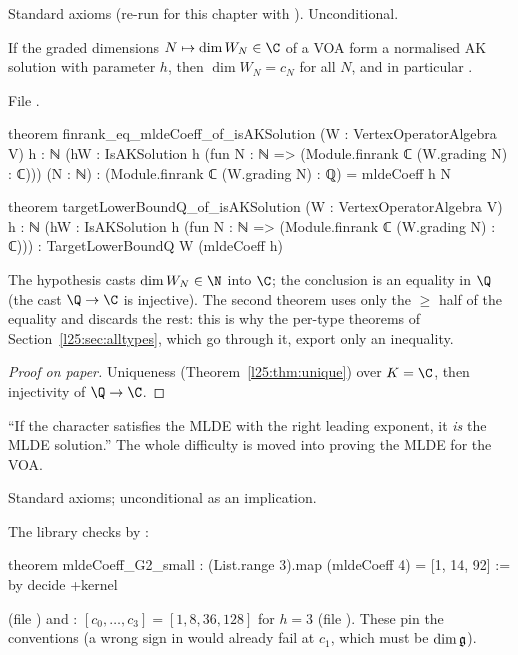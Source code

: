 \begin{status}
Standard axioms (re-run for this chapter with ). Unconditional.
\end{status}

\begin{theorem}\label{l25:thm:fromAK}
If the graded dimensions $N\mapsto\dim W_N\in\C$ of a VOA form a normalised AK solution with parameter $h$, then
$\dim W_N=c_N$ for all $N$, and in particular .
\end{theorem}
\noindent File .
\begin{leancode}
theorem finrank_eq_mldeCoeff_of_isAKSolution (W : VertexOperatorAlgebra V) {h : ℕ}
    (hW : IsAKSolution h (fun N : ℕ => (Module.finrank ℂ (W.grading N) : ℂ))) (N : ℕ) :
    (Module.finrank ℂ (W.grading N) : ℚ) = mldeCoeff h N

theorem targetLowerBoundQ_of_isAKSolution (W : VertexOperatorAlgebra V) {h : ℕ}
    (hW : IsAKSolution h (fun N : ℕ => (Module.finrank ℂ (W.grading N) : ℂ))) :
    TargetLowerBoundQ W (mldeCoeff h)
\end{leancode}
\begin{dictionary}
The hypothesis casts $\dim W_N\in\N$ into $\C$; the conclusion is an equality in $\Q$ (the cast $\Q\to\C$ is
injective). The second theorem uses only the $\ge$ half of the equality and discards the rest: this is why the
per-type theorems of Section~\ref{l25:sec:alltypes}, which go through it, export only an inequality.
\end{dictionary}
\begin{proof}[Proof on paper]
Uniqueness (Theorem~\ref{l25:thm:unique}) over $K=\C$, then injectivity of $\Q\to\C$.
\end{proof}
\begin{physics}
``If the character satisfies the MLDE with the right leading exponent, it \emph{is} the MLDE solution.'' The
whole difficulty is moved into proving the MLDE for the VOA.
\end{physics}
\begin{status}
Standard axioms; unconditional as an implication.
\end{status}

\begin{example}\label{l25:ex:small}
The library checks by :
\begin{leancode}
theorem mldeCoeff_G2_small : (List.range 3).map (mldeCoeff 4) = [1, 14, 92] := by decide +kernel
\end{leancode}
\noindent (file ) and
: $[c_0,\dots,c_3]=[1,8,36,128]$ for $h=3$ (file ). These pin
the conventions (a wrong sign in  would already fail at $c_1$, which must be $\dim\mathfrak g$).
\end{example}

